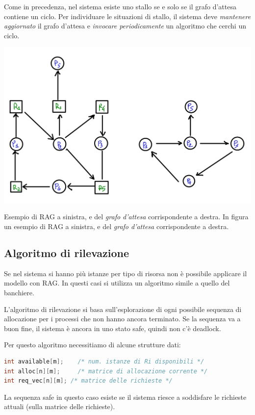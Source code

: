\documentclass[a4paper,12pt, twoside]{report}
\begin{document}
Come in precedenza, nel sistema esiste uno stallo se e solo se il grafo d'attesa contiene un ciclo. Per individuare le situazioni di stallo, il sistema deve \emph{mantenere aggiornato} il grafo d'attesa e \emph{invocare periodicamente} un algoritmo che cerchi un ciclo. 
\begin{center}
\includegraphics[scale=0.25]{RAG-detection}
\end{center}
Esempio di RAG a sinistra, e del \emph{grafo d'attesa} corrispondente a destra.
In figura un esempio di RAG a sinistra, e del \emph{grafo d'attesa} corrispondente a destra.

\subsection{Algoritmo di rilevazione}
Se nel sistema si hanno pi\`u istanze per tipo di risorsa non \`e possibile applicare il modello con RAG. In questi casi si utilizza un algoritmo simile a quello del banchiere. 

L'algoritmo di rilevazione si basa sull'esplorazione di ogni possibile sequenza di allocazione per i processi che non hanno ancora terminato. Se la sequenza va a buon fine, il sistema \`e ancora in uno stato safe, quindi non c'\`e deadlock. 

Per questo algoritmo necessitiamo di alcune strutture dati: 
\begin{lstlisting}[language=C]
int available[m];	 /* num. istanze di Ri disponibili */
int alloc[n][m];	 /* matrice di allocazione corrente */
int req_vec[n][m]; /* matrice delle richieste */
\end{lstlisting}

La sequenza safe in questo caso esiste se il sistema riesce a soddisfare le richieste attuali (sulla matrice delle richieste).
\end{document}
